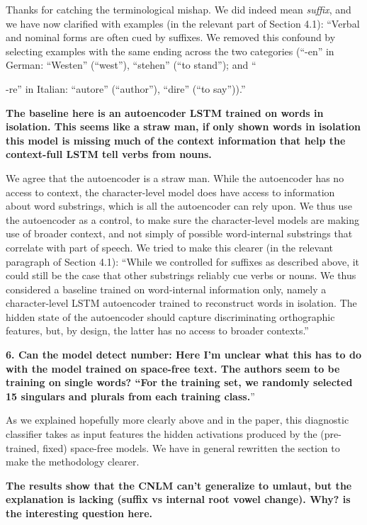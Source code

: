 \documentclass{article}[11pt,a4paper,oneside]
\begin{document}
Thanks for catching the terminological mishap. We did indeed mean \emph{suffix}, and we have now clarified with examples (in the relevant part of Section 4.1): ``Verbal and nominal forms are often cued by suffixes. We removed this confound by selecting examples with the same ending across the two categories (``-en'' in German: ``Westen'' (``west''), ``stehen'' (``to stand''); and ``{-re'' in Italian: ``autore'' (``author''), ``dire'' (``to say'')).''
\newline

\textbf{The baseline here is an autoencoder LSTM trained on words in isolation.  This seems like a straw man, if only shown words in isolation this model is missing much of the context information that help the context-full LSTM tell verbs from nouns.}

We agree that the autoencoder is a straw man. While the autoencoder has no access to context, the character-level model does have access to information about word substrings, which is all the autoencoder can rely upon. We thus use the autoencoder as a control, to make sure the character-level models are making use of broader context, and not simply of possible word-internal substrings that correlate with part of speech. We tried to make this clearer (in the relevant paragraph of Section 4.1): ``While we controlled for suffixes as described above, it could still be the case that other substrings reliably cue verbs or nouns. We thus considered a baseline trained on word-internal information only, namely a character-level LSTM autoencoder trained to reconstruct words in isolation.  The hidden state of the autoencoder should capture discriminating orthographic features, but, by design, the latter has no access to broader contexts.'' 
\newline

\textbf{6. Can the model detect number: Here I'm unclear what this has to do with the model trained on space-free text.  The authors seem to be training on single words? ``For the training set, we randomly selected 15 singulars and plurals from each training class.}''

As we explained hopefully more clearly above and in the paper, this diagnostic classifier takes as input features the hidden activations produced by the (pre-trained, fixed) space-free models. We have in general rewritten the section to make the methodology clearer.
\newline

\textbf{The results show that the CNLM can't generalize to umlaut, but the explanation is lacking (suffix vs internal root vowel change).  Why? is the interesting question here.}

}
\end{document}
